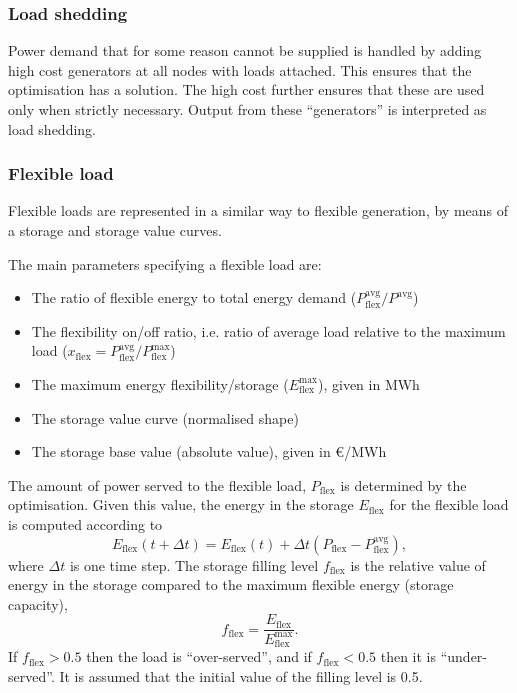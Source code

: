 \documentclass{article}
\begin{document}
\subsubsection{Load shedding}
Power demand that for some reason cannot be supplied is handled by adding high cost generators at all nodes with loads attached. This ensures that the optimisation has a solution.
The high cost further ensures that these are used only when strictly necessary. Output from these ``generators'' is interpreted as load shedding.

\subsubsection{Flexible load}
Flexible loads are represented in a similar way to flexible generation, by means of a storage and storage value curves. 

The main parameters specifying a flexible load are:
\begin{itemize}
\item The ratio of flexible energy to total energy demand ($P_\text{flex}^\text{avg}/P^\text{avg}$)
\item The flexibility on/off ratio, i.e. ratio of average load  relative to the maximum load ($x_\text{flex} = P_\text{flex}^\text{avg} / P_\text{flex}^\text{max}$)
\item The maximum energy flexibility/storage ($E_\text{flex}^\text{max}$), given in MWh
\item The storage value curve (normalised shape)
\item The storage base value (absolute value), given in €/MWh
\end{itemize}
%
%

The amount of power served to the flexible load, $P_\text{flex}$ is determined by the optimisation. Given this value, the energy in the storage $E_\text{flex}$ for the flexible load is computed according to
\begin{equation}
	 E_\text{flex}(t+\Delta t) = E_\text{flex}(t) + \Delta t (
		P_\text{flex}-P_\text{flex}^\text{avg} ),
\end{equation}
where $\Delta t$ is one time step.
The storage filling level $f_\text{flex}$ is the relative value of energy in the storage compared to the maximum flexible energy (storage capacity),
\begin{equation}
	f_\text{flex} =  \frac{E_\text{flex}}{E_\text{flex}^\text{max}}.
\end{equation}
If $f_\text{flex}>0.5$ then the load is ``over-served'', and 
if $f_\text{flex}<0.5$ then it is ``under-served''.
It is assumed that the initial value of the filling level is 0.5.
\end{document}
